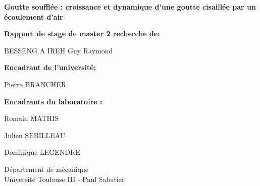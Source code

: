 \begin{titlepage}
    \begin{center}



      \LARGE
      \textbf{Goutte soufflée : croissance et dynamique d'une goutte cisaillée par un écoulement d'air }


        \vspace{1.5cm}
        \textbf{Rapport de stage de master 2 recherche de:}
        
        BESSENG A IREH Guy Raymond

        \vspace{0.8cm}
        \textbf{Encadrant de l'université:}

        Pierre BRANCHER

        \vspace{0.8cm}
        \textbf{Encadrants du laboratoire :}

        Romain MATHIS

        Julien SEBILLEAU

        Dominique LEGENDRE




        \vfill

        
        \Large
        Département de mécanique\\
        Université Toulouse III - Paul Sabatier\\
        \date{}

    \end{center}
\end{titlepage}

